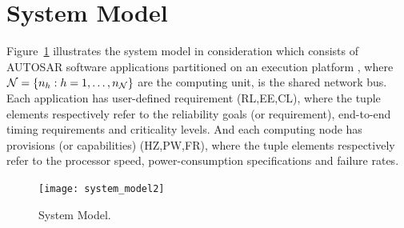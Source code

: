 \section{System Model}\label{sec_system}
Figure~\ref{fig_system} illustrates the system model in consideration which consists of AUTOSAR software applications  partitioned on an execution platform \tteP, where  $\sexp{\pN}{n}[h]$ are the computing unit, \ttpB{} is the shared network bus. Each application has user-defined requirement {\sffamily(RL,EE,CL)}, where the tuple elements respectively refer to the reliability goals (or requirement), end-to-end timing requirements and criticality levels. And each computing node has  provisions (or capabilities) {\sffamily(HZ,PW,FR)}, where the tuple elements respectively refer to the processor speed, power-consumption specifications and failure rates.
 \begin{figure}[!h]
	\centering
	\texttt{[image: system\_model2]}%
	\caption{System Model.}
	\label{fig_system}
\end{figure}

